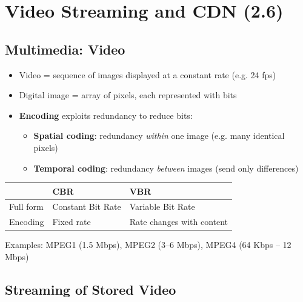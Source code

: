 \newpage
\section{Video Streaming and CDN (2.6)}

\subsection{Multimedia: Video}

\begin{keybox}
\begin{itemize}[noitemsep]
    \item Video = sequence of images displayed at a constant rate (e.g. 24 fps)
    \item Digital image = array of pixels, each represented with bits
    \item \textbf{Encoding} exploits redundancy to reduce bits:
    \begin{itemize}[noitemsep]
        \item \textbf{Spatial coding}: redundancy \textit{within} one image (e.g. many identical pixels)
        \item \textbf{Temporal coding}: redundancy \textit{between} images (send only differences)
    \end{itemize}
\end{itemize}
\end{keybox}

\begin{keybox}
\begin{tabular}{lll}
\toprule
& \textbf{CBR} & \textbf{VBR} \\
\midrule
Full form & Constant Bit Rate & Variable Bit Rate \\
Encoding & Fixed rate & Rate changes with content \\
\bottomrule
\end{tabular}

\vspace{0.3em}
Examples: MPEG1 (1.5 Mbps), MPEG2 (3--6 Mbps), MPEG4 (64 Kbps -- 12 Mbps)
\end{keybox}

\subsection{Streaming of Stored Video}

